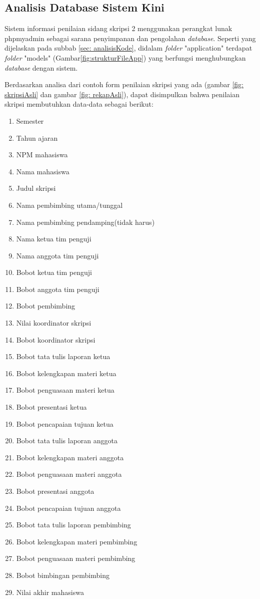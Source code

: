 		
		
	\subsection{Analisis Database Sistem Kini}
	\label{sub: analisisDatabase}
	
	Sistem informasi penilaian sidang skripsi 2 menggunakan perangkat lunak phpmyadmin sebagai sarana penyimpanan dan pengolahan \textit{database}. Seperti yang dijelaskan pada subbab \ref{sec: analisisKode}, didalam \textit{folder} "application" terdapat \textit{folder} "models" (Gambar\ref{fig:strukturFileApp}) yang berfungsi menghubungkan \textit{database} dengan sistem. 
	
	Berdasarkan analisa dari contoh form penilaian skripsi yang ada (gambar \ref{fig: skripsiAsli} dan gambar \ref{fig: rekapAsli}), dapat disimpulkan bahwa penilaian skripsi membutuhkan data-data sebagai berikut:
		
		\begin{enumerate}
			\item Semester
			\item Tahun ajaran
			\item NPM mahasiswa 
			\item Nama mahasiswa
			\item Judul skripsi
			\item Nama pembimbing utama/tunggal
			\item Nama pembimbing pendamping(tidak harus)
			\item Nama ketua tim penguji
			\item Nama anggota tim penguji
			\item Bobot ketua tim penguji
			\item Bobot anggota tim penguji
			\item Bobot pembimbing
			\item Nilai koordinator skripsi
			\item Bobot koordinator skripsi
			\item Bobot tata tulis laporan ketua
			\item Bobot kelengkapan materi ketua
			\item Bobot penguasaan materi ketua
			\item Bobot presentasi ketua
			\item Bobot pencapaian tujuan ketua
			\item Bobot tata tulis laporan anggota
			\item Bobot kelengkapan materi anggota
			\item Bobot penguasaan materi anggota
			\item Bobot presentasi anggota
			\item Bobot pencapaian tujuan anggota
			\item Bobot tata tulis laporan pembimbing
			\item Bobot kelengkapan materi pembimbing
			\item Bobot penguasaan materi pembimbing
			\item Bobot bimbingan pembimbing
			\item Nilai akhir mahasiswa
		\end{enumerate}
	

